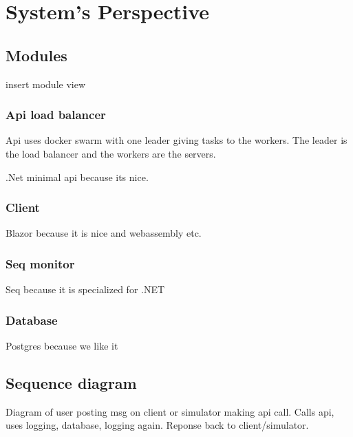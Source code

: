 \section{System's Perspective}
\label{ch:sys_persp} %

\subsection{Modules}
insert module view

\subsubsection{Api load balancer}

Api uses docker swarm with one leader giving tasks 
to the workers. The leader is the load balancer 
and the workers are the servers. 

.Net minimal api because its nice.

\subsubsection{Client}

Blazor because it is nice and webassembly etc.

\subsubsection{Seq monitor}

Seq\cite{seq} because it is specialized for .NET

\subsubsection{Database}

Postgres because we like it


\subsection{Sequence diagram}

Diagram of user posting msg on client or simulator making api call. 
Calls api, uses logging, database, logging again. Reponse back to client/simulator.

